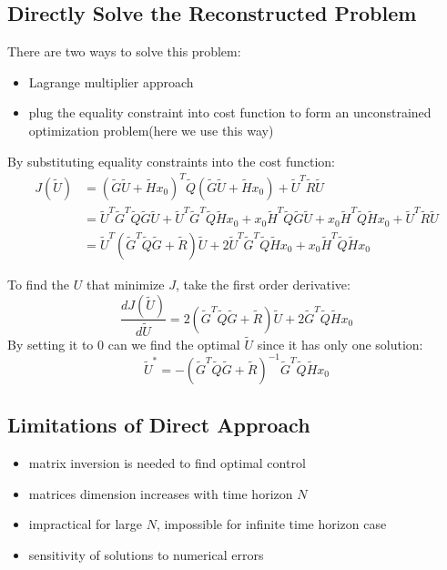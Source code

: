 \documentclass[10pt,a4paper,oneside]{article}
\begin{document}
\subsection{Directly Solve the Reconstructed Problem}
There are two ways to solve this problem:
\begin{itemize}
	\item Lagrange multiplier approach
	\item plug the equality constraint into cost function to form an unconstrained optimization problem(here we use this way)
\end{itemize}
By substituting equality constraints into the cost function:
\begin{align*}
J(\tilde{U}) &= (\tilde{G} \tilde{U} + \tilde{H}x_0)^T \tilde{Q} (\tilde{G} \tilde{U} + \tilde{H}x_0) + \tilde{U}^T \tilde{R} \tilde{U}\\
&= \tilde{U}^T \tilde{G}^T \tilde{Q} \tilde{G} \tilde{U} + \tilde{U}^T \tilde{G}^T \tilde{Q} \tilde{H} x_0 + x_0 \tilde{H}^T  \tilde{Q} \tilde{G} \tilde{U} + x_0 \tilde{H}^T  \tilde{Q} \tilde{H} x_0 + \tilde{U}^T \tilde{R} \tilde{U}\\
&= \tilde{U}^T (\tilde{G}^T \tilde{Q} \tilde{G} +\tilde{R})\tilde{U} + 2 \tilde{U}^T \tilde{G}^T \tilde{Q} \tilde{H} x_0 + x_0 \tilde{H}^T  \tilde{Q} \tilde{H} x_0
\end{align*}

To find the $U$ that minimize $J$, take the first order derivative:
\[
\frac{d J(\tilde{U})}{d \tilde{U}} = 2 (\tilde{G}^T \tilde{Q} \tilde{G} +\tilde{R})\tilde{U} + 2 \tilde{G}^T \tilde{Q} \tilde{H} x_0
\]
By setting it to $0$ can we find the optimal $\tilde{U}$ since it has only one solution:
\[
\tilde{U}^* = -(\tilde{G}^T \tilde{Q} \tilde{G} +\tilde{R})^{-1} \tilde{G}^T \tilde{Q} \tilde{H} x_0
\]

\subsection{Limitations of Direct Approach}
\begin{itemize}
	\item matrix inversion is needed to find optimal control
	\item matrices dimension increases with time horizon $N$
	\item impractical for large $N$, impossible for infinite time horizon case 
	\item sensitivity of solutions to numerical errors
\end{itemize}
\end{document}
